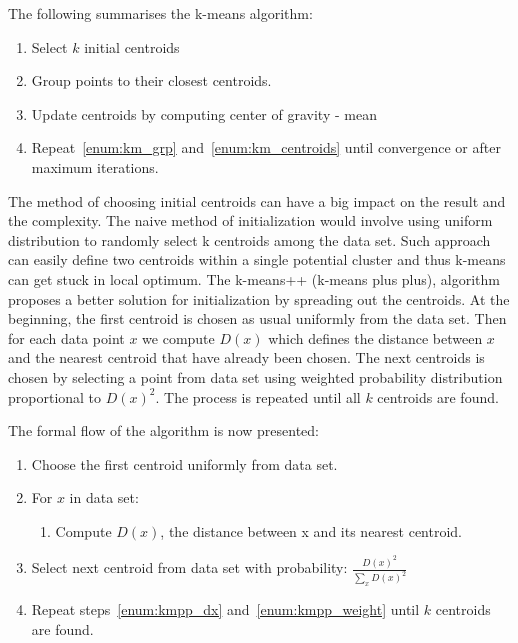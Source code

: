 \documentclass{mini}
\begin{document}
The following summarises the k-means algorithm:

\begin{center}
    
    
    \begin{enumerate}
        \item 
        Select $k$ initial centroids
        \item \label{enum:km_grp} 
        Group points to their closest centroids.
        \item \label{enum:km_centroids} 
        Update centroids by computing center of gravity - mean
        \item 
        Repeat~\ref{enum:km_grp} and~\ref{enum:km_centroids} until convergence or after maximum iterations.
    \end{enumerate}
    
\end{center}

The method of choosing initial centroids can have a big impact on the result and the complexity. The naive method of initialization would involve using uniform distribution to randomly select k centroids among the data set. Such approach can easily define two centroids within a single potential cluster and thus k-means can get stuck in local optimum.
The k-means++ (k-means plus plus), algorithm proposes a better solution for initialization by spreading out the centroids. At the beginning, the first centroid is chosen as usual uniformly from the data set. Then for each data point $x$ we compute $D(x)$ which defines the distance between $x$ and the nearest centroid that have already been chosen. The next centroids is chosen by selecting a point from data set using weighted probability distribution proportional to $D(x)^2$. The process is repeated until all $k$ centroids are found.

The formal flow of the algorithm is now presented:

\begin{enumerate}
    \item 
    Choose the first centroid uniformly from data set.
    \item \label{enum:kmpp_dx}
    For $x$ in data set:
    \begin{enumerate}
        \item
        Compute $D(x)$, the distance between x and its nearest centroid.
    \end{enumerate}
    
    \item \label{enum:kmpp_weight}
    Select next centroid from data set with probability:
    $\frac{D(x)^2}{\sum_{x}D(x)^2}$
    \item 
    Repeat steps~\ref{enum:kmpp_dx} and~\ref{enum:kmpp_weight} until $k$ centroids are found.
\end{enumerate}
\end{document}
